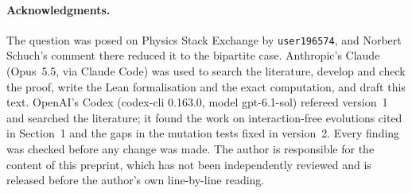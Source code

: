 \documentclass[11pt]{article}
\theoremstyle{remark}
\begin{document}
\paragraph{Acknowledgments.} The question was posed on Physics Stack Exchange by
\texttt{user196574}, and Norbert Schuch's comment there reduced it to the bipartite case.
Anthropic's Claude (Opus~5.5, via Claude Code) was used to search the literature, develop and
check the proof, write the Lean formalisation and the exact computation, and draft this text.
OpenAI's Codex (codex-cli 0.163.0, model gpt-6.1-sol) refereed version~1 and searched the
literature; it found the work on interaction-free evolutions cited in Section~1 and the gaps
in the mutation tests fixed in version~2. Every finding was checked before any change was
made. The author is responsible for the content of this preprint, which has not been
independently reviewed and is released before the author's own line-by-line reading.
\end{document}

